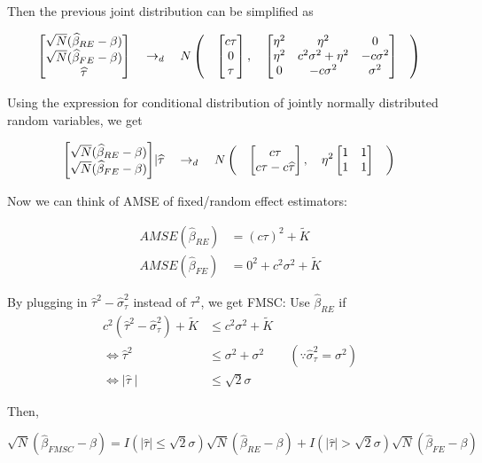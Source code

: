 \documentclass[11pt]{article}
\begin{document}
 Then the previous joint distribution can be simplified as


\[
 \begin{bmatrix}
\sqrt{N} (\widehat{\beta}_{RE} - \beta)\\
\sqrt{N} (\widehat{\beta}_{FE} - \beta)\\
\widehat{\tau}
\end{bmatrix} \quad \rightarrow_d \quad  N \left( \quad  \begin{bmatrix}
c\tau \\
0  \\
\tau\\
\end{bmatrix},  \quad \begin{bmatrix}
\eta^2 & \eta^2 & 0 \\
\eta^2 & c^2\sigma^2 + \eta^2 & -c\sigma^2\\ 
0 & -c\sigma^2 & \sigma^2
\end{bmatrix}  \quad  \right)\\
\]

Using the expression for conditional distribution of jointly normally distributed random variables, we get


\[
 \begin{bmatrix}
\sqrt{N} (\widehat{\beta}_{RE} - \beta)\\
\sqrt{N} (\widehat{\beta}_{FE} - \beta)
\end{bmatrix}   \rvert \widehat{\tau} \quad \rightarrow_d \quad  N \left( \quad  \begin{bmatrix}
c\tau \\
c\tau - c\widehat{\tau}\\
\end{bmatrix},  \quad \eta^2\begin{bmatrix}
1&1\\
1&1
\end{bmatrix}  \quad  \right)\\
\]

Now we can think of AMSE of fixed/random effect estimators:

\begin{align*}
AMSE(\widehat{\beta}_{RE}) & = (c\tau)^2 + \widetilde{K}\\
AMSE(\widehat{\beta}_{FE}) & = 0^2 + c^2\sigma^2+\widetilde{K}
\end{align*}

By plugging in $\widehat{\tau}^2 - \widehat{\sigma}_\tau^2$ instead of $\tau^2$, we get FMSC: Use $\widehat{\beta}_{RE}$ if
\begin{align*}
c^2(\widehat{\tau}^2 -\widehat{\sigma}_\tau^2) + \widetilde{K} & \leq c^2 \sigma^2 + \widetilde{K} \\
\Leftrightarrow \widehat{\tau}^2 & \leq \sigma^2 + \sigma^2 \qquad (\because \widehat{\sigma}_\tau^2 = \sigma^2)\\
\Leftrightarrow  \mid \widehat{\tau} \mid &\leq \sqrt{2} \sigma
\end{align*}

Then, 

\[
\sqrt{N}(\widehat{\beta}_{FMSC} - \beta) = I(\mid \widehat{\tau} \mid \leq \sqrt{2} \sigma) \sqrt{N} (\widehat{\beta}_{RE}-\beta) + I(\mid \widehat{\tau} \mid > \sqrt{2} \sigma) \sqrt{N} (\widehat{\beta}_{FE}-\beta)
\]
\end{document}
